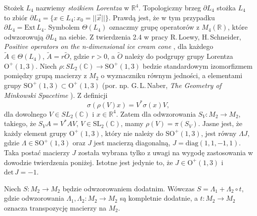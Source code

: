 Stożek $L_{4}$ nazwiemy \emph{stożkiem Lorentza} w $\mathbb{R}^{4}$.
Topologiczny brzeg $\partial L_{4}$ stożka $L_{4}$ to zbiór
$\partial L_{4} = \{ x \in L_{4} : x_{0} = || \vec{x} || \}$.
Prawdą jest, że w tym przypadku $\partial L_{4} = \text{Ext}\,L_{4}$.
Symbolem $\Theta(L_{4})$ oznaczmy grupę operatorów z $M_{4}(\mathbb{R})$,
które odwzorowują $\partial L_{4}$ na siebie.
Z twierdzenia 2.4 w pracy
R.\,Loewy, H.\,Schneider,
\emph{Positive operators on the n-dimensional ice cream cone}
\cite{loewy1975positive},
dla każdego $\tilde{A} \in \Theta(L_{4})$,
$\tilde{A} = r \tilde{O}$,
gdzie $r > 0$, a $\tilde{O}$ należy do
podgrupy grupy Lorentza $\mathrm{O}^{+}(1,3)$.
Niech $\rho: SL_{2}(\mathbb{C}) \rightarrow \text{SO}^{+}(1,3)$
bedzie standardowym izomorfizmem pomiędzy grupą macierzy z $M_{2}$
o wyznaczniku równym jedności, a elementami grupy $\text{SO}^{+}(1,3) \subset \text{O}^{+}(1,3)$
(por. np. G.\,L.\,Naber, \emph{The Geometry of Minkowski Spacetime}
\cite{Naber1992}).
Z definicji
\begin{equation}
\sigma(\rho(V) x) = V^{*} \sigma(x) V,
\end{equation}
dla dowolnego $V \in SL_{2}(\mathbb{C})$ i $x \in \mathbb{R}^{4}$.
Zatem dla odwzorowania $S_{V}: M_{2} \rightarrow M_{2}$,
takiego, że $S_{V} A = V^{*} A V$, $V \in \text{SL}_{2}(\mathbb{C})$,
mamy $\rho(V) = \pi(S_{V})$.
Jasne jest, że każdy element grupy $\text{O}^{+}(1,3)$,
który nie należy do  $\text{SO}^{+}(1,3)$,
jest równy $\Lambda J$,
gdzie $\Lambda \in \text{SO}^{+}(1,3)$ oraz $J$ jest macierzą diagonalną,
$J = \mathrm{diag}(1,1,-1,1)$.
Taka postać macierzy $J$ została wybrana tylko z uwagi na wygodę zastosowania
w dowodzie twierdzenia poniżej.
Istotne jest jedynie to, że
$J \in \text{O}^{+}(1,3)$ i $\mathrm{det} \, J = -1$.

\begin{Theorem}
\label{thm:PositiveMapsOnM2}
    Niech $S:M_{2} \rightarrow M_{2}$ będzie odwzorowaniem dodatnim.
    Wówczas $S = \Lambda_{1}  + \Lambda_{2} \circ t$,
    gdzie odwzorowania
    $\Lambda_{1}, \Lambda_{2}:M_{2} \rightarrow M_{2}$
    są kompletnie dodatnie, a
    $t: M_{2} \rightarrow M_{2}$ oznacza transpozycję macierzy na $M_{2}$.
\end{Theorem}

